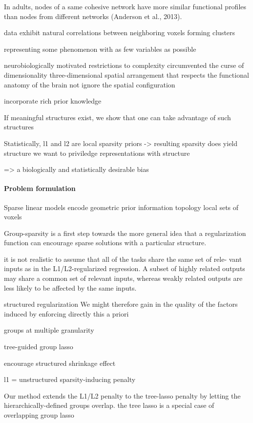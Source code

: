 \documentclass{article} %
\begin{document}
In adults, nodes of a same cohesive network have more
similar functional profiles than nodes from different networks
(Anderson et al., 2013).

data exhibit natural correlations between neighboring voxels forming clusters

representing some phenomenon with as few variables as possible

neurobiologically motivated restrictions to complexity circumvented
the curse of dimensionality
three-dimensional spatial arrangement that respects
the functional anatomy of the brain
not ignore the spatial configuration

incorporate rich prior knowledge

If meaningful structures exist,
we show that one can take advantage of such structures

Statistically,
l1 and l2 are local sparsity priors
-> resulting sparsity does yield structure
we want to priviledge representations with structure


=> 
 a biologically and statistically desirable bias 


\paragraph{Problem formulation}

Sparse linear models
encode geometric prior information
topology
local sets of voxels

Group-sparsity is a first step towards the more general idea that
a regularization function can encourage sparse solutions with a particular structure. 

it is not realistic to assume that all of the tasks share the same set of rele- vant inputs as in the L1/L2-regularized regression. A subset of highly related outputs may share a common set of relevant inputs, whereas weakly related outputs are less likely to be affected by the same inputs.

structured regularization
We might therefore gain in the quality of the factors
induced by enforcing directly this a priori 

groups at multiple granularity

tree-guided group lasso

encourage structured shrinkage effect 

l1 = unstructured sparsity-inducing penalty

Our method extends the L1/L2 penalty to the tree-lasso penalty
by letting the hierarchically-defined groups overlap. 
the tree lasso is a special case of overlapping group lasso
\end{document}
